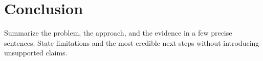 \section{Conclusion}
\label{sec:conclusion}

Summarize the problem, the approach, and the evidence in a few precise sentences. State limitations and the most credible next steps without introducing unsupported claims.
